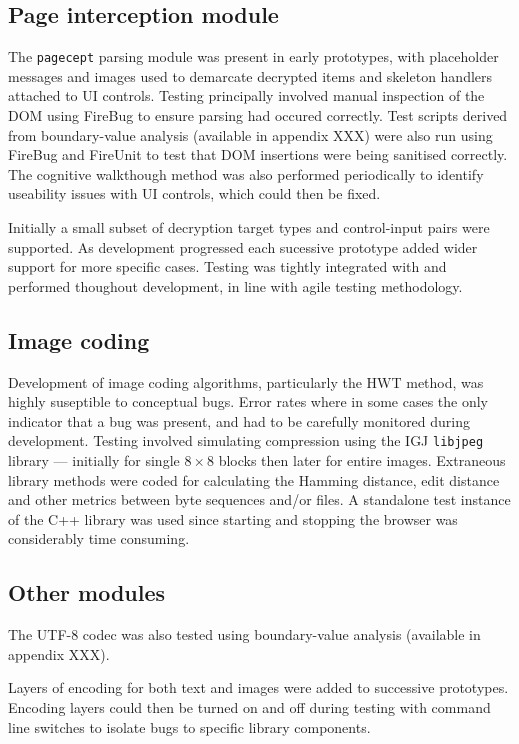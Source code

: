 \subsection{Page interception module}

The {\tt pagecept} parsing module was present in early prototypes, with placeholder messages and images used to demarcate decrypted items and skeleton handlers attached to UI controls. Testing principally involved manual inspection of the DOM using FireBug to ensure parsing had occured correctly. Test scripts derived from boundary-value analysis (available in appendix XXX) were also run using FireBug and FireUnit to test that DOM insertions were being sanitised correctly. The cognitive walkthough method was also performed periodically to identify useability issues with UI controls, which could then be fixed.

Initially a small subset of decryption target types and control-input pairs were supported. As development progressed each sucessive prototype added wider support for more specific cases. Testing was tightly integrated with and performed thoughout development, in line with agile testing methodology.


\subsection{Image coding}

Development of image coding algorithms, particularly the HWT method, was highly suseptible to conceptual bugs. Error rates where in some cases the only indicator that a bug was present, and had to be carefully monitored during development. Testing involved simulating compression using the IGJ {\tt libjpeg} library --- initially for single $8 \times 8$ blocks then later for entire images. Extraneous library methods were coded for calculating the Hamming distance, edit distance and other metrics between byte sequences and/or files. A standalone test instance of the C++ library was used since starting and stopping the browser was considerably time consuming.


\subsection{Other modules}

The UTF-8 codec was also tested using boundary-value analysis (available in appendix XXX). 

Layers of encoding for both text and images were added to successive prototypes. Encoding layers could then be turned on and off during testing with command line switches to isolate bugs to specific library components.


